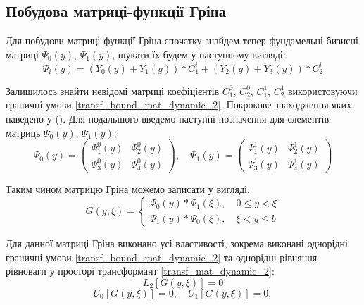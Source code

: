 \subsection{Побудова матриці-функції Гріна}
Для побудови матриці-функції Гріна спочатку знайдем тепер фундамельні бизисні матриці $\Psi_0(y)$, $\Psi_1(y)$, шукати їх будем у наступному вигляді:
\begin{equation}\label{psi_dynamic_2}
    \Psi_i(y) = \left( Y_0(y) + Y_1(y) \right) * C_1^i + \left( Y_2(y) + Y_3(y) \right) * C_2^i
\end{equation}

Залишилось знайти невідомі матриці коєфіцієнтів $C_1^0$, $C_2^0$, $C_1^1$, $C_2^1$ використовуючи граничні умови \eqref{transf_bound_mat_dynamic_2}.
Покрокове знаходження яких наведено у ().
Для подальшого введемо наступні позначення для елементів матриць $\Psi_0(y)$, $\Psi_1(y)$:
\begin{equation*}
    \Psi_0(y) = \begin{pmatrix}
        \Psi_1^0(y) &  \Psi_2^0(y) \\
        \Psi_3^0(y) &  \Psi_4^0(y) 
    \end{pmatrix}, \quad 
    \Psi_1(y) = \begin{pmatrix}
        \Psi_1^1(y) &  \Psi_2^1(y) \\
        \Psi_3^1(y) &  \Psi_4^1(y) 
    \end{pmatrix}      
\end{equation*}

Таким чином матрицю Гріна можемо записати у вигляді:
\begin{equation}
    G(y,\xi) = 
    \begin{cases}
        \Psi_0(y) * \Psi_1(\xi), \quad 0 \le y < \xi \\
        \Psi_1(y) * \Psi_0(\xi), \quad \xi < y \le b
    \end{cases}
\end{equation}

Для данної матриці Гріна виконано усі властивості, зокрема виконані однорідні граничні умови \eqref{transf_bound_mat_dynamic_2}
та однорідні рівняння рівноваги у просторі трансформант \eqref{transf_mat_dynamic_2}:
\begin{equation*}
    L_2\left[  G(y, \xi) \right] = 0
\end{equation*}
\begin{equation*}
    U_0\left[ G(y, \xi) \right] = 0, \quad  U_1\left[ G(y, \xi) \right] = 0,
\end{equation*}

